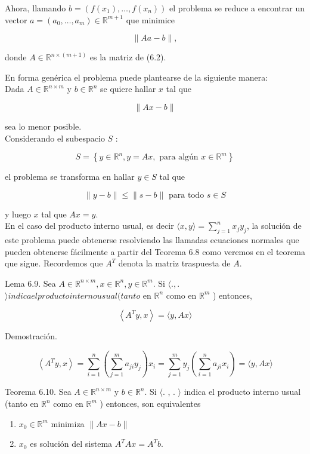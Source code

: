 \documentclass[10pt]{article}
\begin{document}
Ahora, llamando $b=\left(f\left(x_{1}\right), \ldots, f\left(x_{n}\right)\right)$ el problema se reduce a encontrar un vector $a= \left(a_{0}, \ldots, a_{m}\right) \in \mathbb{R}^{m+1}$ que minimice

$$
\|A a-b\|,
$$

donde $A \in \mathbb{R}^{n \times(m+1)}$ es la matriz de (6.2).

En forma genérica el problema puede plantearse de la siguiente manera:\\
Dada $A \in \mathbb{R}^{n \times m}$ y $b \in \mathbb{R}^{n}$ se quiere hallar $x$ tal que

$$
\|A x-b\|
$$

sea lo menor posible.\\
Considerando el subespacio $S$ :

$$
S=\left\{y \in \mathbb{R}^{n}, y=A x, \text { para algún } x \in \mathbb{R}^{m}\right\}
$$

el problema se transforma en hallar $y \in S$ tal que

$$
\|y-b\| \leq\|s-b\| \text { para todo } s \in S
$$

y luego $x$ tal que $A x=y$.\\
En el caso del producto interno usual, es decir $\langle x, y\rangle=\sum_{j=1}^{n} x_{j} y_{j}$, la solución de este problema puede obtenerse resolviendo las llamadas ecuaciones normales que pueden obtenerse fácilmente a partir del Teorema 6.8 como veremos en el teorema que sigue. Recordemos que $A^{T}$ denota la matriz traspuesta de $A$.

Lema 6.9. Sea $A \in \mathbb{R}^{n \times m}, x \in \mathbb{R}^{n}, y \in \mathbb{R}^{m}$. Si $\langle.,$.$\rangle indica el producto interno usual (tanto$ en $\mathbb{R}^{n}$ como en $\mathbb{R}^{m}$ ) entonces,

$$
\left\langle A^{T} y, x\right\rangle=\langle y, A x\rangle
$$

Demostración.

$$
\left\langle A^{T} y, x\right\rangle=\sum_{i=1}^{n}\left(\sum_{j=1}^{m} a_{j i} y_{j}\right) x_{i}=\sum_{j=1}^{m} y_{j}\left(\sum_{i=1}^{n} a_{j i} x_{i}\right)=\langle y, A x\rangle
$$

Teorema 6.10. Sea $A \in \mathbb{R}^{n \times m}$ y $b \in \mathbb{R}^{n}$. Si $\langle$. , . $\rangle$ indica el producto interno usual (tanto en $\mathbb{R}^{n}$ como en $\mathbb{R}^{m}$ ) entonces, son equivalentes

\begin{enumerate}
  \item $x_{0} \in \mathbb{R}^{m}$ minimiza $\|A x-b\|$
  \item $x_{0}$ es solución del sistema $A^{T} A x=A^{T} b$.
\end{enumerate}
\end{document}

